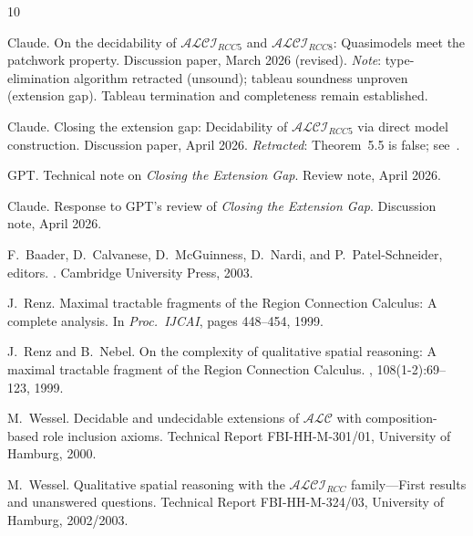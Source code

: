\documentclass[a4paper,11pt]{article}
\theoremstyle{definition}
\begin{document}

\begin{thebibliography}{10}

Claude.
\newblock On the decidability of {$\mathcal{ALCI}_{\mathit{RCC5}}$} and
  {$\mathcal{ALCI}_{\mathit{RCC8}}$}: Quasimodels meet the patchwork
  property.
\newblock Discussion paper, March 2026 (revised).
\newblock \emph{Note}: type-elimination algorithm retracted (unsound);
  tableau soundness unproven (extension gap).  Tableau termination and
  completeness remain established.

Claude.
\newblock Closing the extension gap: Decidability of
  {$\mathcal{ALCI}_{\mathit{RCC5}}$} via direct model construction.
\newblock Discussion paper, April 2026.
\newblock \emph{Retracted}: Theorem~5.5 is false; see~\cite{GPTReview}.

GPT.
\newblock Technical note on \emph{Closing the Extension Gap}.
\newblock Review note, April 2026.

Claude.
\newblock Response to GPT's review of \emph{Closing the Extension Gap}.
\newblock Discussion note, April 2026.

F.~Baader, D.~Calvanese, D.~McGuinness, D.~Nardi, and P.~Patel-Schneider,
  editors.
.
\newblock Cambridge University Press, 2003.

J.~Renz.
\newblock Maximal tractable fragments of the {Region Connection Calculus}: A
  complete analysis.
\newblock In {\em Proc.\ IJCAI}, pages 448--454, 1999.

J.~Renz and B.~Nebel.
\newblock On the complexity of qualitative spatial reasoning: A maximal
  tractable fragment of the {Region Connection Calculus}.
, 108(1-2):69--123, 1999.

M.~Wessel.
\newblock Decidable and undecidable extensions of {$\mathcal{ALC}$} with
  composition-based role inclusion axioms.
\newblock Technical Report FBI-HH-M-301/01, University of Hamburg, 2000.

M.~Wessel.
\newblock Qualitative spatial reasoning with the
  {$\mathcal{ALCI}_\mathit{RCC}$} family---{F}irst results and unanswered
  questions.
\newblock Technical Report FBI-HH-M-324/03, University of Hamburg, 2002/2003.

\end{thebibliography}
\end{document}
